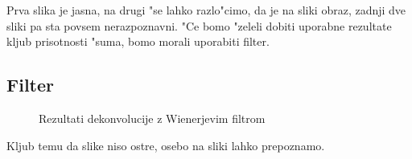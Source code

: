 \documentclass[a4paper,10pt]{article}
\begin{document}
Prva slika je jasna, na drugi "se lahko razlo"cimo, da je na sliki obraz, zadnji dve sliki pa sta povsem nerazpoznavni. "Ce bomo "zeleli dobiti uporabne rezultate kljub prisotnosti "suma, bomo morali uporabiti filter. 

\subsection{Filter}

\begin{figure}[h]
 \centering
{}
\caption{Rezultati dekonvolucije z Wienerjevim filtrom}
\label{fig:lincoln-filter}
\end{figure}

Kljub temu da slike niso ostre, osebo na sliki lahko prepoznamo. 
\end{document}
